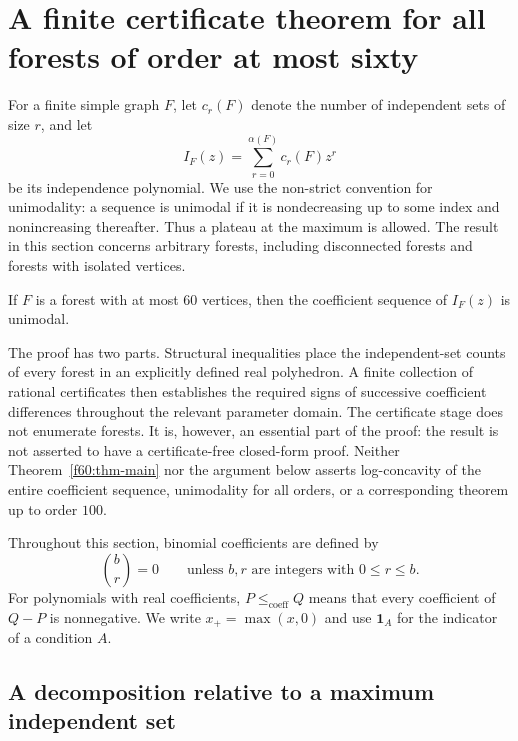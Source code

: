 \section{A finite certificate theorem for all forests of order at most sixty}
\label{f60:sec-main}

For a finite simple graph $F$, let $c_r(F)$ denote the number of independent
sets of size $r$, and let
\[
 I_F(z)=\sum_{r=0}^{\alpha(F)}c_r(F)z^r
\]
be its independence polynomial.  We use the non-strict convention for
unimodality: a sequence is unimodal if it is nondecreasing up to some index
and nonincreasing thereafter.  Thus a plateau at the maximum is allowed.
The result in this section concerns arbitrary forests, including disconnected
forests and forests with isolated vertices.

\begin{theorem}
\label{f60:thm-main}
If $F$ is a forest with at most $60$ vertices, then the coefficient sequence
of $I_F(z)$ is unimodal.
\end{theorem}

The proof has two parts.  Structural inequalities place the independent-set
counts of every forest in an explicitly defined real polyhedron.  A finite
collection of rational certificates then establishes the required signs of
successive coefficient differences throughout the relevant parameter
domain.  The certificate stage does not enumerate forests.  It is,
however, an essential part of the proof: the result is not asserted to have
a certificate-free closed-form proof.  Neither Theorem~\ref{f60:thm-main}
nor the argument below asserts log-concavity of the entire coefficient
sequence, unimodality for all orders, or a corresponding theorem up to
order $100$.

Throughout this section, binomial coefficients are defined by
\[
 \binom{b}{r}=0\qquad\text{unless }b,r\text{ are integers with }0\le r\le b.
\]
For polynomials with real coefficients, $P\le_{\mathrm{coeff}}Q$ means
that every coefficient of $Q-P$ is nonnegative.  We write
$x_+=\max(x,0)$ and use $\mathbf{1}_{A}$ for the indicator of a condition
$A$.

\subsection{A decomposition relative to a maximum independent set}
\label{f60:subsec-decomposition}


